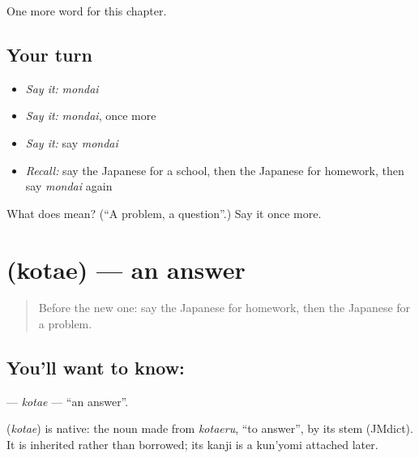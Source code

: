 \begin{grammarlens}[title={What you've built}]
One more word for this chapter.
\end{grammarlens}

\subsection*{Your turn}
\begin{itemize}
\raggedright
  \item \emph{Say it:} \emph{mondai}
  \item \emph{Say it:} \emph{mondai}, once more
  \item \emph{Say it:} say \emph{mondai}
  \item \emph{Recall:} say the Japanese for a school, then the Japanese for homework, then say \emph{mondai} again
\end{itemize}

\begin{tcolorbox}[breakable,colback=teal!4,colframe=teal!35!black,title={Before you move on}]
What does  mean? (\textquotedblleft{}A problem, a question\textquotedblright{}.) Say it once more.
\end{tcolorbox}
\section[\texorpdfstring{\ja{こたえ} (kotae)}{こたえ (kotae)}]{ (kotae) — an answer}

\label{lesson:JA-C40-kotae}



\begin{quote}
Before the new one: say the Japanese for homework, then the Japanese for a problem.
\end{quote}

\subsection*{You'll want to know: }
\textbf{} — \emph{kotae} — \textquotedblleft{}an answer\textquotedblright{}.

\begin{cousinweb}
\textbf{} (\emph{kotae}) is native: the noun made from \emph{kotaeru}, \textquotedblleft{}to answer\textquotedblright{}, by its stem (JMdict). It is inherited rather than borrowed; its kanji is a kun'yomi attached later.
\end{cousinweb}


